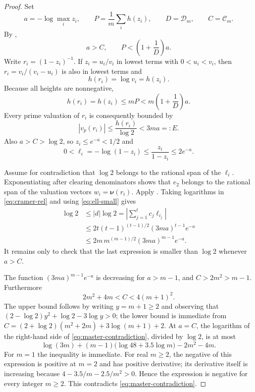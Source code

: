 \documentclass[11pt]{article}
\theoremstyle{definition}
\newcommand{\val}{\boldsymbol\nu}
\newcommand{\D}{\mathcal D}
\newcommand{\Kc}{\mathcal C}
\begin{document}
\begin{proof}
Set
\[
 a=-\log\max_i z_i,\qquad P=\frac1m\sum_i h(z_i),
 \qquad D=\D_m,\qquad C=\Kc_m.
\]
By ,
\begin{equation}\label{eq:aPconditions}
 a>C,\qquad P<\left(1+\frac1D\right)a.
\end{equation}
Write $r_i=(1-z_i)^{-1}$.  If $z_i=u_i/v_i$ in lowest terms with
$0<u_i<v_i$, then $r_i=v_i/(v_i-u_i)$ is also in lowest terms and
\begin{equation}\label{eq:equal-heights}
 h(r_i)=\log v_i=h(z_i).
\end{equation}
Because all heights are nonnegative,
\[
 h(r_i)=h(z_i)\le mP<m\left(1+\frac1D\right)a.
\]
Every prime valuation of $r_i$ is consequently bounded by
\begin{equation}\label{eq:Ebound}
 |v_p(r_i)|\le\frac{h(r_i)}{\log2}<3ma=:E.
\end{equation}
Also $a>C>\log2$, so $z_i\le e^{-a}<1/2$ and
\begin{equation}\label{eq:ell-small}
 0<\ell_i=-\log(1-z_i)\le\frac{z_i}{1-z_i}\le2e^{-a}.
\end{equation}

Assume for contradiction that $\log2$ belongs to the rational span of the $\ell_i$.
Exponentiating after clearing denominators shows that $e_2$ belongs to the rational span of
the valuation vectors $w_i=\val(r_i)$.  Apply .  Taking logarithms in
\eqref{eq:cramer-rel} and using \eqref{eq:ell-small} gives
\begin{align}
 \log2
 &\le |d|\log2
  =\left|\sum_{j=1}^t c_j\ell_{i_j}\right| \\
 &\le 2t(t-1)^{(t-1)/2}(3ma)^{t-1}e^{-a} \\
 &\le 2m\,m^{(m-1)/2}(3ma)^{m-1}e^{-a}.
 \label{eq:master-contradiction}
\end{align}
It remains only to check that the last expression is smaller than $\log2$ whenever
$a>C$.

The function $(3ma)^{m-1}e^{-a}$ is decreasing for $a>m-1$, and $C>2m^2>m-1$.
Furthermore
\begin{equation}\label{eq:Cupperlower}
 2m^2+4m< C<4(m+1)^2.
\end{equation}
The upper bound follows by writing $y=m+1\ge2$ and observing that
$(2-\log2)y^2+\log2-3\log y>0$; the lower bound is immediate from
$C=(2+\log2)(m^2+2m)+3\log(m+1)+2$.
At $a=C$, the logarithm of the right-hand side of
\eqref{eq:master-contradiction}, divided by $\log2$, is at most
\[
 \log(3m)+(m-1)\bigl(\log48+3.5\log m\bigr)-2m^2-4m.
\]
For $m=1$ the inequality is immediate.  For real $m\ge2$, the negative of this expression is
positive at $m=2$ and has positive derivative; its derivative itself is increasing because
$4-3.5/m-2.5/m^2>0$.  Hence the expression is negative for every integer $m\ge2$.
This contradicts \eqref{eq:master-contradiction}.
\end{proof}
\end{document}
